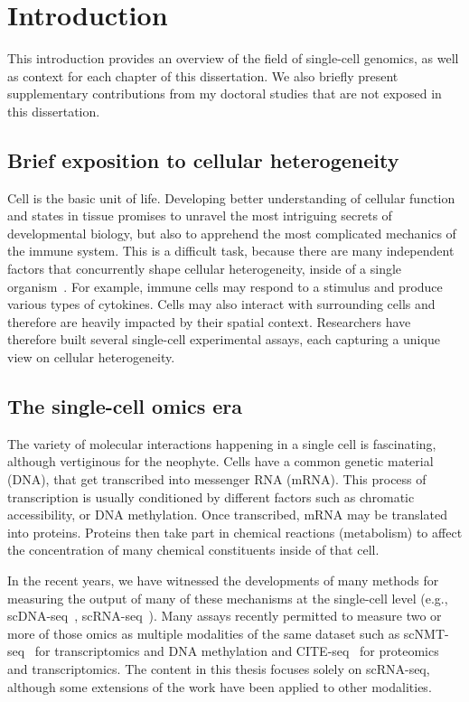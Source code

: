 \chapter{Introduction}
This introduction provides an overview of the field of single-cell genomics, as well as context for each chapter of this dissertation. We also briefly present supplementary contributions from my doctoral studies that are not exposed in this dissertation. 

\section{Brief exposition to cellular heterogeneity}

Cell is the basic unit of life. Developing better understanding of cellular function and states in tissue promises to unravel the most intriguing secrets of developmental biology, but also to apprehend the most complicated mechanics of the immune system. This is a difficult task, because there are many independent factors that concurrently shape cellular heterogeneity, inside of a single organism~\cite{wagner.revealing}. For example, immune cells may respond to a stimulus and produce various types of cytokines. Cells may also interact with surrounding cells and therefore are heavily impacted by their spatial context. Researchers have therefore built several single-cell experimental assays, each capturing a unique view on cellular heterogeneity. 

\section{The single-cell omics era}

The variety of molecular interactions happening in a single cell is fascinating, although vertiginous for the neophyte. Cells have a common genetic material (DNA), that get transcribed into messenger RNA (mRNA). This process of transcription is usually conditioned by different factors such as chromatic accessibility, or DNA methylation. Once transcribed, mRNA may be translated into proteins. Proteins then take part in chemical reactions (metabolism) to affect the concentration of many chemical constituents inside of that cell. 

In the recent years, we have witnessed the developments of many methods for measuring the output of many of these mechanisms at the single-cell level (e.g., scDNA-seq~\cite{wang2014clonal}, scRNA-seq~\cite{dropseq}). Many assays recently permitted to measure two or more of those omics as multiple modalities of the same dataset such as scNMT-seq~\cite{clark2018scnmt} for transcriptomics and DNA methylation and CITE-seq~\cite{stoeckius2017simultaneous} for proteomics and transcriptomics. The content in this thesis focuses solely on scRNA-seq, although some extensions of the work have been applied to other modalities.

